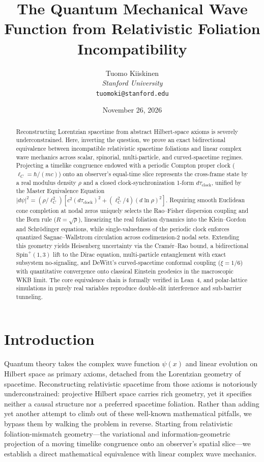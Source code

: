 \documentclass[11pt, a4paper]{article}
\title{\textbf{The Quantum Mechanical Wave Function from Relativistic Foliation Incompatibility}}
\author{Tuomo Kiiskinen\\
\small \textit{Stanford University}\\
\small \texttt{tuomoki@stanford.edu}}
\date{November 26, 2026}
\theoremstyle{definition}
\begin{document}
\maketitle

\begin{abstract}
\noindent Reconstructing Lorentzian spacetime from abstract Hilbert-space axioms is severely underconstrained. Here, inverting the question, we prove an exact bidirectional equivalence between incompatible relativistic spacetime foliations and linear complex wave mechanics across scalar, spinorial, multi-particle, and curved-spacetime regimes. Projecting a timelike congruence endowed with a periodic Compton proper clock ($\ell_C = \hbar/(mc)$) onto an observer's equal-time slice represents the cross-frame state by a real modulus density $\rho$ and a closed clock-synchronization 1-form $d\tau_{\mathrm{clock}}$, unified by the Master Equivalence Equation $|d\psi|^2 = (\rho/\ell_C^2)[c^2(d\tau_{\mathrm{clock}})^2 + (\ell_C^2/4)(d\ln\rho)^2]$. Requiring smooth Euclidean cone completion at nodal zeros uniquely selects the Rao--Fisher dispersion coupling and the Born rule ($R=\sqrt{\rho}$), linearizing the real foliation dynamics into the Klein--Gordon and Schr\"odinger equations, while single-valuedness of the periodic clock enforces quantized Sagnac--Wallstrom circulation across codimension-2 nodal sets. Extending this geometry yields Heisenberg uncertainty via the Cram\'er--Rao bound, a bidirectional $\mathrm{Spin}^+(1,3)$ lift to the Dirac equation, multi-particle entanglement with exact subsystem no-signaling, and DeWitt's curved-spacetime conformal coupling ($\xi=1/6$) with quantitative convergence onto classical Einstein geodesics in the macroscopic WKB limit. The core equivalence chain is formally verified in Lean~4, and polar-lattice simulations in purely real variables reproduce double-slit interference and sub-barrier tunneling.
\end{abstract}

\tableofcontents

\section{Introduction}
\label{sec:intro}

Quantum theory takes the complex wave function $\psi(x)$ and linear evolution on Hilbert space as primary axioms, detached from the Lorentzian geometry of spacetime. Reconstructing relativistic spacetime from those axioms is notoriously underconstrained: projective Hilbert space carries rich geometry, yet it specifies neither a causal structure nor a preferred spacetime foliation. Rather than adding yet another attempt to climb out of these well-known mathematical pitfalls, we bypass them by walking the problem in reverse. Starting from relativistic foliation-mismatch geometry---the variational and information-geometric projection of a moving timelike congruence onto an observer's spatial slice---we establish a direct mathematical equivalence with linear complex wave mechanics.
\end{document}
